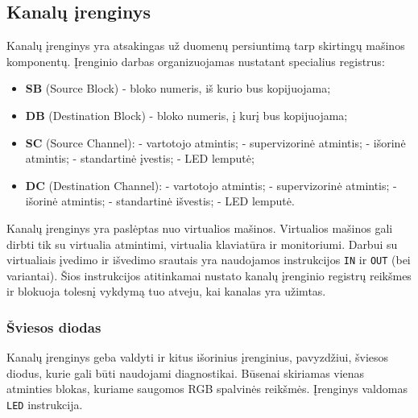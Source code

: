 \documentclass{scrartcl}
\begin{document}
        \subsection{Kanalų įrenginys}
            Kanalų įrenginys yra atsakingas už duomenų persiuntimą tarp skirtingų mašinos komponentų. Įrenginio darbas organizuojamas nustatant specialius registrus:
            \begin{itemize}
                \item \textbf{SB} (Source Block) - bloko numeris, iš kurio bus kopijuojama;
                \item \textbf{DB} (Destination Block) - bloko numeris, į kurį bus kopijuojama;
                \item \textbf{SC} (Source Channel):
                     - vartotojo atmintis;
                     - supervizorinė atmintis;
                     - išorinė atmintis;
                     - standartinė įvestis;
                     - LED lemputė;
                \item \textbf{DC} (Destination Channel):
                     - vartotojo atmintis;
                     - supervizorinė atmintis;
                     - išorinė atmintis;
                     - standartinė išvestis;
                     - LED lemputė.
            \end{itemize}
            Kanalų įrenginys yra paslėptas nuo virtualios mašinos. Virtualios mašinos gali dirbti tik su virtualia atmintimi, virtualia klaviatūra ir monitoriumi. Darbui su virtualiais įvedimo ir išvedimo srautais yra naudojamos instrukcijos \texttt{IN} ir \texttt{OUT} (bei variantai). Šios instrukcijos atitinkamai nustato kanalų įrenginio registrų reikšmes ir blokuoja tolesnį vykdymą tuo atveju, kai kanalas yra užimtas.
            \subsubsection{Šviesos diodas}
                Kanalų įrenginys geba valdyti ir kitus išorinius įrenginius, pavyzdžiui, šviesos diodus, kurie gali būti naudojami diagnostikai. Būsenai skiriamas vienas atminties blokas, kuriame saugomos RGB spalvinės reikšmės. Įrenginys valdomas \texttt{LED} instrukcija.
    \pagebreak
\end{document}
